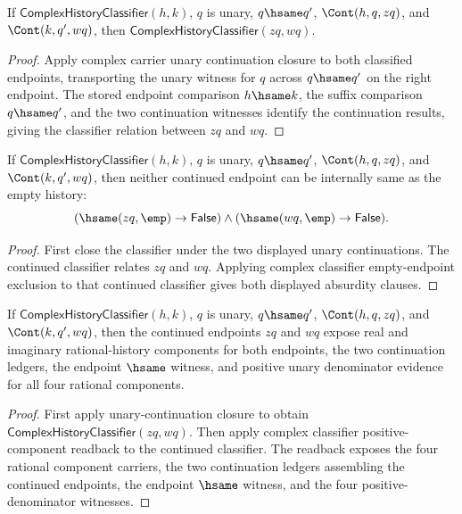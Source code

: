 \begin{theorem}
\label{thm:complex-history-classifier-unary-continuation-closed}
If \(\mathsf{ComplexHistoryClassifier}(h,k)\), \(q\) is unary,
\(q\hsame q'\), \(\Cont(h,q,zq)\), and \(\Cont(k,q',wq)\), then
\(\mathsf{ComplexHistoryClassifier}(zq,wq)\).
\end{theorem}
\begin{proof}
Apply complex carrier unary continuation closure to both classified endpoints,
transporting the unary witness for \(q\) across \(q\hsame q'\) on the right
endpoint. The stored endpoint comparison \(h\hsame k\), the suffix comparison
\(q\hsame q'\), and the two continuation witnesses identify the continuation
results, giving the classifier relation between \(zq\) and \(wq\).
\end{proof}

\begin{theorem}
\label{thm:complex-history-classifier-unary-continuation-empty-endpoint-absurd}
If \(\mathsf{ComplexHistoryClassifier}(h,k)\), \(q\) is unary,
\(q\hsame q'\), \(\Cont(h,q,zq)\), and \(\Cont(k,q',wq)\), then neither
continued endpoint can be internally same as the empty history:
$$
(\hsame(zq,\emp)\to\mathsf{False})
\land
(\hsame(wq,\emp)\to\mathsf{False}).
$$
\end{theorem}
\begin{proof}
First close the classifier under the two displayed unary continuations. The
continued classifier relates \(zq\) and \(wq\). Applying complex classifier
empty-endpoint exclusion to that continued classifier gives both displayed
absurdity clauses.
\end{proof}

\begin{theorem}
\label{thm:complex-history-classifier-unary-continuation-positive-components}
If \(\mathsf{ComplexHistoryClassifier}(h,k)\), \(q\) is unary,
\(q\hsame q'\), \(\Cont(h,q,zq)\), and \(\Cont(k,q',wq)\), then the
continued endpoints \(zq\) and \(wq\) expose real and imaginary
rational-history components for both endpoints, the two continuation ledgers,
the endpoint \(\hsame\) witness, and positive unary denominator evidence for
all four rational components.
\end{theorem}
\begin{proof}
First apply unary-continuation closure to obtain
\(\mathsf{ComplexHistoryClassifier}(zq,wq)\). Then apply complex classifier
positive-component readback to the continued classifier. The readback exposes
the four rational component carriers, the two continuation ledgers assembling
the continued endpoints, the endpoint \(\hsame\) witness, and the four
positive-denominator witnesses.
\end{proof}

